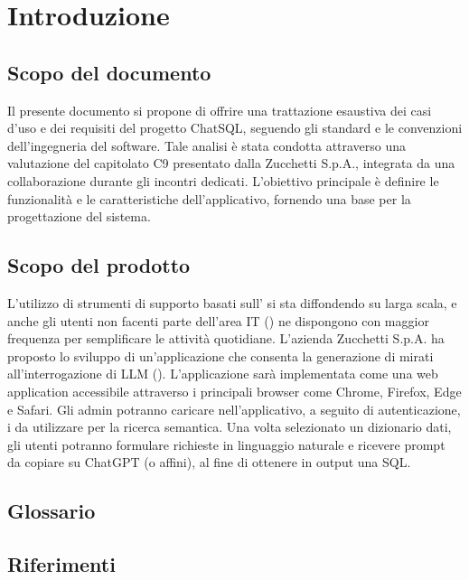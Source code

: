 \section{Introduzione}

\subsection{Scopo del documento}
\par Il presente documento si propone di offrire una trattazione esaustiva dei casi d'uso e dei requisiti del progetto ChatSQL, seguendo gli standard e le convenzioni dell'ingegneria del software. Tale analisi è stata condotta attraverso una valutazione del capitolato C9 presentato dalla  Zucchetti S.p.A., integrata da una collaborazione durante gli incontri dedicati. L'obiettivo principale è definire le funzionalità e le caratteristiche dell’applicativo, fornendo una base per la progettazione del sistema.

\subsection{Scopo del prodotto}
\par L’utilizzo di strumenti di supporto basati sull’ si sta diffondendo su larga scala, e anche gli utenti non facenti parte dell’area IT () ne dispongono con maggior frequenza per semplificare le attività quotidiane. L’azienda Zucchetti S.p.A. ha proposto lo sviluppo di un’applicazione che consenta la generazione di  mirati all’interrogazione di LLM (). L'applicazione sarà implementata come una web application accessibile attraverso i principali browser come Chrome, Firefox, Edge e Safari. Gli admin potranno caricare nell’applicativo, a seguito di autenticazione, i  da utilizzare per la ricerca semantica. Una volta selezionato un dizionario dati, gli utenti potranno formulare richieste in linguaggio naturale e ricevere prompt da copiare su ChatGPT (o affini), al fine di ottenere in output una  SQL.

\subsection{Glossario}
\GlossarioIntroduzione

\subsection{Riferimenti}
